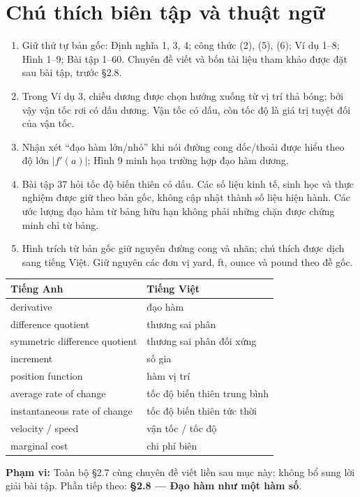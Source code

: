 \documentclass[12pt,a4paper]{article}
\begin{document}
\section*{Chú thích biên tập và thuật ngữ}
\begin{enumerate}
\item Giữ thứ tự bản gốc: Định nghĩa 1, 3, 4; công thức (2), (5), (6); Ví dụ 1–8; Hình 1–9; Bài tập 1–60. Chuyên đề viết và bốn tài liệu tham khảo được đặt sau bài tập, trước §2.8.
\item Trong Ví dụ 3, chiều dương được chọn hướng xuống từ vị trí thả bóng; bởi vậy vận tốc rơi có dấu dương. Vận tốc có dấu, còn tốc độ là giá trị tuyệt đối của vận tốc.
\item Nhận xét “đạo hàm lớn/nhỏ” khi nói đường cong dốc/thoải được hiểu theo độ lớn $|f'(a)|$; Hình 9 minh họa trường hợp đạo hàm dương.
\item Bài tập 37 hỏi tốc độ biến thiên có dấu. Các số liệu kinh tế, sinh học và thực nghiệm được giữ theo bản gốc, không cập nhật thành số liệu hiện hành. Các ước lượng đạo hàm từ bảng hữu hạn không phải những chặn được chứng minh chỉ từ bảng.
\item Hình trích từ bản gốc giữ nguyên đường cong và nhãn; chú thích được dịch sang tiếng Việt. Giữ nguyên các đơn vị yard, ft, ounce và pound theo đề gốc.
\end{enumerate}
\begin{center}\begin{tabular}{ll}\toprule Tiếng Anh&Tiếng Việt\\\midrule
derivative&đạo hàm\\
difference quotient&thương sai phân\\
symmetric difference quotient&thương sai phân đối xứng\\
increment&số gia\\
position function&hàm vị trí\\
average rate of change&tốc độ biến thiên trung bình\\
instantaneous rate of change&tốc độ biến thiên tức thời\\
velocity / speed&vận tốc / tốc độ\\
marginal cost&chi phí biên\\\bottomrule
\end{tabular}\end{center}
\noindent\textbf{Phạm vi:} Toàn bộ §2.7 cùng chuyên đề viết liền sau mục này; không bổ sung lời giải bài tập. Phần tiếp theo: \textbf{§2.8 — Đạo hàm như một hàm số}.
\end{document}

